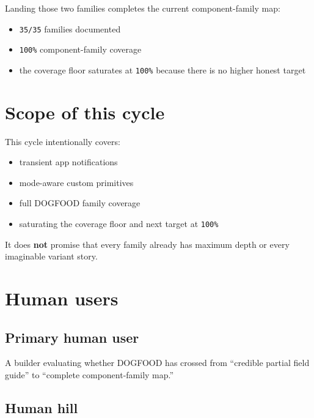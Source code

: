 Landing those two families completes the current component-family map:

\begin{itemize}
\tightlist
\item
  \texttt{3\allowbreak{}5\allowbreak{}/\allowbreak{}3\allowbreak{}5} families documented
\item
  \texttt{1\allowbreak{}0\allowbreak{}0\allowbreak{}\%} component-family coverage
\item
  the coverage floor saturates at \texttt{1\allowbreak{}0\allowbreak{}0\allowbreak{}\%} because there is no higher honest target
\end{itemize}

\section{Scope of this cycle}\label{record-081-scope-of-this-cycle}

This cycle intentionally covers:

\begin{itemize}
\tightlist
\item
  transient app notifications
\item
  mode-aware custom primitives
\item
  full DOGFOOD family coverage
\item
  saturating the coverage floor and next target at \texttt{1\allowbreak{}0\allowbreak{}0\allowbreak{}\%}
\end{itemize}

It does \textbf{not} promise that every family already has maximum depth or every imaginable variant story.

\section{Human users}\label{record-081-human-users}

\subsection{Primary human user}\label{record-081-primary-human-user}

A builder evaluating whether DOGFOOD has crossed from ``credible partial field guide'' to ``complete component-family map.''

\subsection{Human hill}\label{record-081-human-hill}

